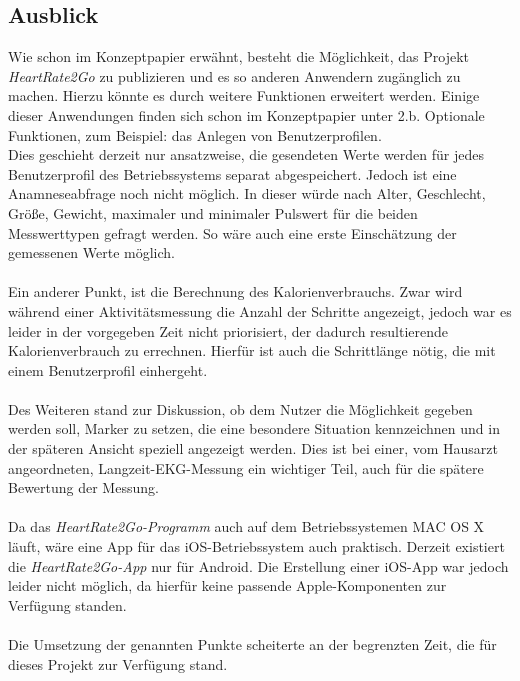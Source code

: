 \subsection{Ausblick} \label{sec:Ausblick}
Wie schon im Konzeptpapier erwähnt, besteht die Möglichkeit, das Projekt \textit{HeartRate2Go} zu publizieren und es so anderen Anwendern zugänglich zu machen. Hierzu könnte es durch weitere Funktionen erweitert werden. Einige dieser Anwendungen finden sich schon im Konzeptpapier unter 2.b. Optionale Funktionen, zum Beispiel: das Anlegen von Benutzerprofilen. \\ Dies geschieht derzeit nur ansatzweise, die gesendeten Werte werden für jedes Benutzerprofil des Betriebssystems separat abgespeichert. Jedoch ist eine Anamneseabfrage noch nicht möglich. In dieser würde nach Alter, Geschlecht, Größe, Gewicht, maximaler und minimaler Pulswert für die beiden Messwerttypen gefragt werden. So wäre auch eine erste Einschätzung der gemessenen Werte möglich.\\
\\
Ein anderer Punkt, ist die Berechnung des Kalorienverbrauchs. Zwar wird während einer Aktivitätsmessung die Anzahl der Schritte angezeigt, jedoch war es leider in der vorgegeben Zeit nicht priorisiert, der dadurch resultierende Kalorienverbrauch zu errechnen. Hierfür ist auch die Schrittlänge nötig, die mit einem Benutzerprofil einhergeht.\\
\\
Des Weiteren stand zur Diskussion, ob dem Nutzer die Möglichkeit gegeben werden soll, Marker zu setzen, die eine besondere Situation kennzeichnen und in der späteren Ansicht speziell angezeigt werden. Dies ist bei einer, vom Hausarzt angeordneten, Langzeit-EKG-Messung ein wichtiger Teil, auch für die spätere Bewertung der Messung.\\
\\
Da das \textit{HeartRate2Go-Programm} auch auf dem Betriebssystemen MAC OS X läuft, wäre eine App für das iOS-Betriebssystem auch praktisch. Derzeit existiert die \textit{HeartRate2Go-App} nur für Android. Die Erstellung einer iOS-App war jedoch leider nicht möglich, da hierfür keine passende Apple-Komponenten zur Verfügung standen.\\
\\
Die Umsetzung der genannten Punkte scheiterte an der begrenzten Zeit, die für dieses Projekt zur Verfügung stand.
